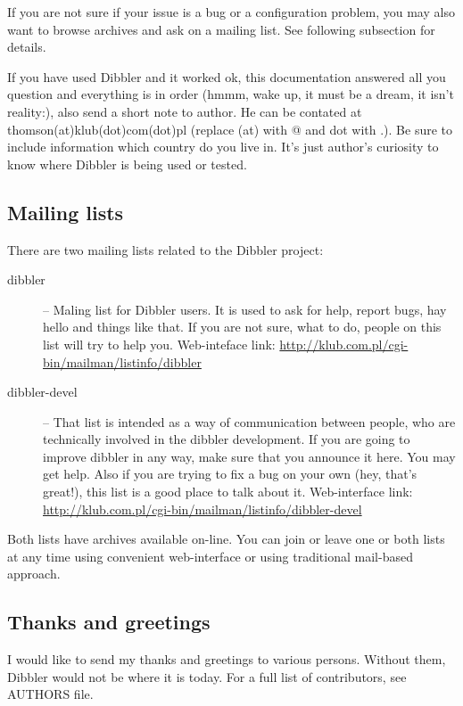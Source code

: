If you are not sure if your issue is a bug or a configuration problem,
you may also want to browse archives and ask on a mailing list. See
following subsection for details.

If you have used Dibbler and it worked ok, this documentation answered
all you question and everything is in order (hmmm, wake up, it must be
a dream, it isn't reality:), also send a short note to author. He can
be contated at thomson(at)klub(dot)com(dot)pl (replace (at) with @ and
dot with .). Be sure to include information which country do you live
in. It's just author's curiosity to know where Dibbler is being used
or tested.

\subsection{Mailing lists}
\label{mailing-list}
There are two mailing lists related to the Dibbler project:
\begin{description}
\item[dibbler] -- Maling list for Dibbler users. It is used to ask for help,
report bugs, hay hello and things like that. If you are not sure, what to
do, people on this list will try to help you. Web-inteface link:
\href{http://klub.com.pl/cgi-bin/mailman/listinfo/dibbler}{http://klub.com.pl/cgi-bin/mailman/listinfo/dibbler}
\item[dibbler-devel] -- That list is intended as a way of communication
between people, who are technically involved in the dibbler development.
If you are going to improve dibbler in any way, make sure that you announce
it here. You may get help. Also if you are trying to fix a bug on your own
(hey, that's great!), this list is a good place to talk about it.
Web-interface link: \href{http://klub.com.pl/cgi-bin/mailman/listinfo/dibbler-devel}{http://klub.com.pl/cgi-bin/mailman/listinfo/dibbler-devel}
\end{description}

Both lists have archives available on-line. You can join or leave one or both lists
at any time using convenient web-interface or using traditional mail-based approach.

\subsection{Thanks and greetings}

I would like to send my thanks and greetings to various persons.
Without them, Dibbler would not be where it is today. For a full list
of contributors, see AUTHORS file.

